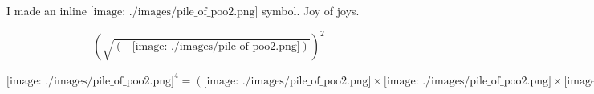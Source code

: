 \documentclass[12pt]{article}
\newcommand{\poop}{\mathord{\texttt{[image: ./images/pile\_of\_poo2.png]}}}
\begin{document}
I made an inline $\poop$ symbol. Joy of joys.


\[
\left( \boldsymbol{\sqrt{ \left( -\poop \right) }} \right)^2
\]

\begin{equation}
\poop^4 = \left(\poop\times\poop\times\poop\times\poop\right)
\end{equation}
\end{document}
